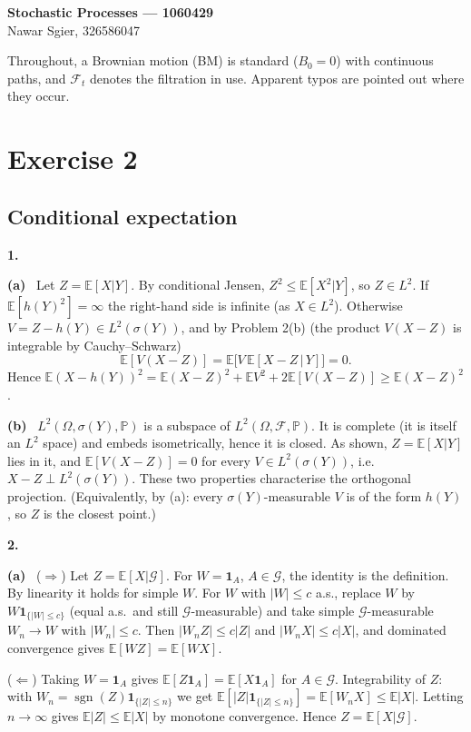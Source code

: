\documentclass[11pt,a4paper]{article}
\newcommand{\E}{\mathbb{E}}
\renewcommand{\P}{\mathbb{P}}
\newcommand{\F}{\mathcal{F}}
\newcommand{\G}{\mathcal{G}}
\newcommand{\1}{\mathbf{1}}
\newcommand{\sgn}{\operatorname{sgn}}
\newcommand{\prob}[1]{\par\medskip\noindent\textbf{#1}\quad}
\newcommand{\sub}[1]{\par\smallskip\noindent\textbf{#1}\ }
\begin{document}
\begin{center}
{\large\textbf{Stochastic Processes --- 1060429}}\\[2pt]
Nawar Sgier, 326586047
\end{center}

\noindent Throughout, a Brownian motion (BM) is standard ($B_0=0$) with continuous paths, and
$\F_t$ denotes the filtration in use. Apparent typos are pointed out where they occur.

\section*{Exercise 2}
\subsection*{Conditional expectation}

\prob{1.}
\sub{(a)} Let $Z=\E[X|Y]$. By conditional Jensen, $Z^2\le\E[X^2|Y]$, so $Z\in L^2$. If
$\E[h(Y)^2]=\infty$ the right-hand side is infinite (as $X\in L^2$). Otherwise $V=Z-h(Y)\in
L^2(\sigma(Y))$, and by Problem 2(b) (the product $V(X-Z)$ is integrable by Cauchy--Schwarz)
\[
\E[V(X-Z)]=\E\big[V\,\E[X-Z\,|\,Y]\big]=0 .
\]
Hence $\E(X-h(Y))^2=\E(X-Z)^2+\E V^2+2\E[V(X-Z)]\ge\E(X-Z)^2$.

\sub{(b)} $L^2(\Omega,\sigma(Y),\P)$ is a subspace of $L^2(\Omega,\F,\P)$. It is complete (it is itself an $L^2$ space) and embeds isometrically, hence it is closed. As shown, $Z=\E[X|Y]$ lies in
it, and $\E[V(X-Z)]=0$ for every $V\in L^2(\sigma(Y))$, i.e.\ $X-Z\perp L^2(\sigma(Y))$. These two
properties characterise the orthogonal projection. (Equivalently, by (a): every $\sigma(Y)$-measurable $V$ is of the form $h(Y)$, so $Z$ is the closest point.)

\prob{2.}
\sub{(a)} ($\Rightarrow$) Let $Z=\E[X|\G]$. For $W=\1_A$, $A\in\G$, the identity is the definition. By linearity
it holds for simple $W$. For $W$ with $|W|\le c$ a.s., replace $W$ by $W\1_{\{|W|\le c\}}$ (equal a.s.\ and still $\G$-measurable) and take simple $\G$-measurable $W_n\to W$ with $|W_n|\le c$.
Then $|W_nZ|\le c|Z|$ and $|W_nX|\le c|X|$, and dominated convergence gives $\E[WZ]=\E[WX]$.

($\Leftarrow$) Taking $W=\1_A$ gives $\E[Z\1_A]=\E[X\1_A]$ for $A\in\G$. Integrability of $Z$: with
$W_n=\sgn(Z)\1_{\{|Z|\le n\}}$ we get $\E[|Z|\1_{\{|Z|\le n\}}]=\E[W_nX]\le\E|X|$. Letting $n\to\infty$ gives $\E|Z|\le\E|X|$ by
monotone convergence. Hence $Z=\E[X|\G]$.
\end{document}
